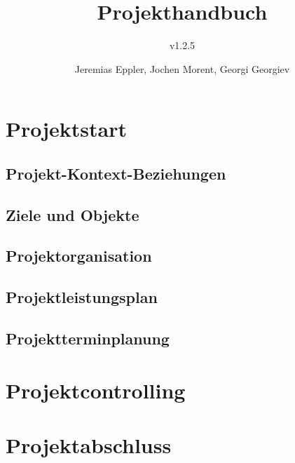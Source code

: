 \documentclass[10pt,a4paper]{scrreprt}
\title{Projekthandbuch}
\subtitle{v1.2.5}
\author{Jeremias Eppler, Jochen Morent, Georgi Georgiev}
\begin{document}
\maketitle
\tableofcontents
\newpage
\chapter{Projektstart}
	\section{Projekt-Kontext-Beziehungen}
		
		\newpage
		
		\newpage
		
	\clearpage
	\section{Ziele und Objekte}
		
	\clearpage
	\section{Projektorganisation}
		
	\clearpage
	\section{Projektleistungsplan}
		
		\newpage
		
	\clearpage
	\section{Projektterminplanung}
		
		\newpage
		
		\newpage
		

\newpage
\chapter{Projektcontrolling}
	
	\clearpage
	

\newpage
\chapter{Projektabschluss}
	
\end{document}
